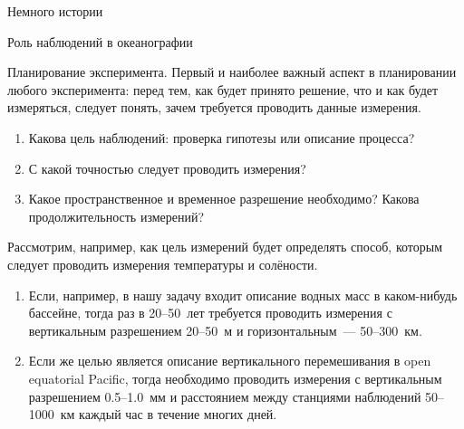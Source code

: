 \begin{chapter}{Немного истории}
\begin{section}{Роль наблюдений в океанографии}
\begin{paragraph}{Планирование эксперимента.}
Первый и наиболее важный аспект в планировании любого эксперимента:
перед тем, как будет принято решение, что и как будет измеряться, 
следует понять, зачем требуется проводить данные измерения.

\begin{enumerate}
\item 
Какова цель наблюдений: проверка гипотезы или описание процесса?
%

\item 
С какой точностью следует проводить измерения?
%

\item
Какое пространственное и временное разрешение необходимо? Какова
продолжительность измерений?
%
\end{enumerate}

Рассмотрим, например, как цель измерений будет определять способ, которым
следует проводить измерения температуры и солёности.
%

\begin{enumerate}
\item
Если, например, в нашу задачу входит описание водных масс в каком-нибудь 
бассейне, тогда раз в 20--50~лет требуется проводить измерения
с вертикальным разрешением 20--50~м и горизонтальным~--- 50--300~км.
%

\item
Если же целью является описание вертикального перемешивания 
в open equatorial Pacific,
тогда необходимо проводить измерения с вертикальным разрешением
0.5--1.0~мм и расстоянием между станциями наблюдений 50--1000~км
каждый час в течение многих дней.
%
\end{enumerate}
\end{paragraph}


\end{section}
\end{chapter}
